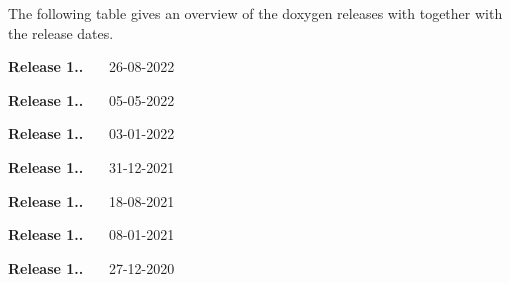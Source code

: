 \label{md_doxygen_doc_internal_releases_pg_rel}%
%
 The following table gives an overview of the doxygen releases with together with the release dates. 
\begin{DoxyItemize}
\item {\bfseries{Release 1..}}~~~ 26-\/08-\/2022 
\item {\bfseries{Release 1..}}~~~ 05-\/05-\/2022 
\item {\bfseries{Release 1..}}~~~ 03-\/01-\/2022 
\item {\bfseries{Release 1..}}~~~ 31-\/12-\/2021 
\item {\bfseries{Release 1..}}~~~ 18-\/08-\/2021 
\item {\bfseries{Release 1..}}~~~ 08-\/01-\/2021 
\item {\bfseries{Release 1..}}~~~ 27-\/12-\/2020 
\item {}
 

\end{DoxyItemize}
